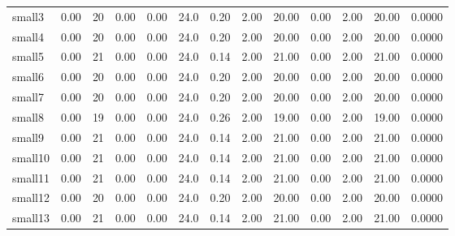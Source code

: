 \documentclass[sigconf]{acmart}
\begin{document}
\begin{table}[t]
\begin{tabular}{l|ccc|ccc|ccc|ccc}
    small3   & 0.00                                  & 20                          & 0.00                     & 0.00                    & 24.0   & 0.20   & 2.00    & 20.00   & 0.00   & 2.00    & 20.00   & 0.0000 \\
    small4   & 0.00                                  & 20                          & 0.00                     & 0.00                    & 24.0   & 0.20   & 2.00    & 20.00   & 0.00   & 2.00    & 20.00   & 0.0000 \\
    small5   & 0.00                                  & 21                          & 0.00                     & 0.00                    & 24.0   & 0.14   & 2.00    & 21.00   & 0.00   & 2.00    & 21.00   & 0.0000 \\
    small6   & 0.00                                  & 20                          & 0.00                     & 0.00                    & 24.0   & 0.20   & 2.00    & 20.00   & 0.00   & 2.00    & 20.00   & 0.0000 \\
    small7   & 0.00                                  & 20                          & 0.00                     & 0.00                    & 24.0   & 0.20   & 2.00    & 20.00   & 0.00   & 2.00    & 20.00   & 0.0000 \\
    small8   & 0.00                                  & 19                          & 0.00                     & 0.00                    & 24.0   & 0.26   & 2.00    & 19.00   & 0.00   & 2.00    & 19.00   & 0.0000 \\
    small9   & 0.00                                  & 21                          & 0.00                     & 0.00                    & 24.0   & 0.14   & 2.00    & 21.00   & 0.00   & 2.00    & 21.00   & 0.0000 \\
    small10  & 0.00                                  & 21                          & 0.00                     & 0.00                    & 24.0   & 0.14   & 2.00    & 21.00   & 0.00   & 2.00    & 21.00   & 0.0000 \\
    small11  & 0.00                                  & 21                          & 0.00                     & 0.00                    & 24.0   & 0.14   & 2.00    & 21.00   & 0.00   & 2.00    & 21.00   & 0.0000 \\
    small12  & 0.00                                  & 20                          & 0.00                     & 0.00                    & 24.0   & 0.20   & 2.00    & 20.00   & 0.00   & 2.00    & 20.00   & 0.0000 \\
    small13  & 0.00                                  & 21                          & 0.00                     & 0.00                    & 24.0   & 0.14   & 2.00    & 21.00   & 0.00   & 2.00    & 21.00   & 0.0000 \\

\end{tabular}
\end{table}
\end{document}

